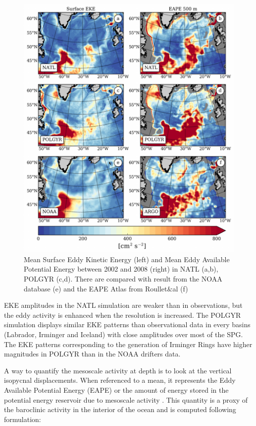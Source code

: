 \documentclass[os, manuscript]{copernicus}
\begin{document}
\begin{figure}[t]
\includegraphics[width=15cm]{../fig_os/f05.pdf}
\caption{Mean Surface Eddy Kinetic Energy (left) and Mean Eddy Available Potential Energy between 2002 and 2008 (right) in NATL (a,b), POLGYR (c,d). There are compared with result from the NOAA database (e) and the EAPE Atlas from Roullet$\&$al (f)}
\label{f05}
\end{figure}

EKE amplitudes in the NATL simulation are weaker than in observations, but the eddy activity is enhanced when the resolution is increased. The POLGYR simulation displays similar EKE patterns than observational data in every basins (Labrador, Irminger and Iceland) with close amplitudes over most of the SPG. The EKE patterns corresponding to the generation of Irminger Rings have higher magnitudes in POLGYR than in the NOAA drifters data.

A way to quantify the mesoscale activity at depth is to look at the vertical isopycnal displacements. When referenced to a mean, it represents the Eddy Available Potential Energy (EAPE) or the amount of energy stored in the potential energy reservoir due to mesoscale activity \citep{lorenz1955}. This quantity is a proxy of the baroclinic activity in the interior of the ocean and is computed following \citet{roullet2014} formulation:
\end{document}
